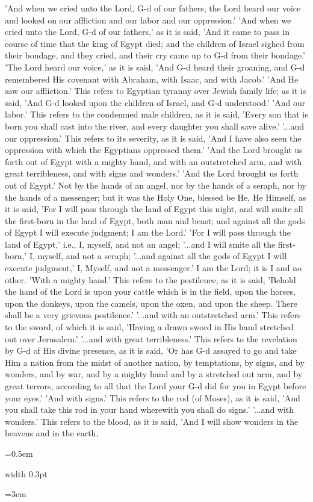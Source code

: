 \documentclass[11pt, openany]{book}
\newcommand{\sederdivider}{%
  \par\vspace{6pt}
  \begin{center}
    \textcolor{sedergold}{\pgfornament[width=1.5cm]{11}}
  \end{center}
  \par\vspace{6pt}
}
\newlength{\bidiHebWidth}
\newlength{\bidiEngWidth}
\newenvironment{bilingual}{%
  \par\vspace{4pt}%
}{%
  \noindent
  \begin{minipage}[t]{\bidiEngWidth}
    \setstretch{1.4}\emergencystretch=0.5em\normalsize
    \usebox{\bidiEngBox}
  \end{minipage}%
  \hfill
  {\color{sedergold}\vrule width 0.3pt}%
  \hfill
  \begin{minipage}[t]{\bidiHebWidth}
    \begingroup\hebrewfont\TeXXeTstate=1\beginR
    \large\setstretch{1.4}\emergencystretch=3em\tolerance=9999\parindent=0pt\relax
    \usebox{\bidiHebBox}
    \endR\endgroup
  \end{minipage}%
  \par\vspace{2pt}%
}
\newenvironment{englishcol}{%
  \begin{lrbox}{\bidiEngBox}\begin{minipage}{\bidiEngWidth}%
}{%
  \end{minipage}\end{lrbox}%
}
\begin{document}
\begin{bilingual}
\begin{englishcol}
'And when we cried unto the Lord, G-d of our fathers, the Lord heard our voice and looked on our affliction and our labor and our oppression.' 'And when we cried unto the Lord, G-d of our fathers,' as it is said, 'And it came to pass in course of time that the king of Egypt died; and the children of Israel sighed from their bondage, and they cried, and their cry came up to G-d from their bondage.'
'The Lord heard our voice,' as it is said, 'And G-d heard their groaning, and G-d remembered His covenant with Abraham, with Isaac, and with Jacob.'
'And He saw our affliction.' This refers to Egyptian tyranny over Jewish family life; as it is said, 'And G-d looked upon the children of Israel, and G-d understood.'
'And our labor.' This refers to the condemned male children, as it is said, 'Every son that is born you shall cast into the river, and every daughter you shall save alive.' '...and our oppression.' This refers to its severity, as it is said, 'And I have also seen the oppression with which the Egyptians oppressed them.'
'And the Lord brought us forth out of Egypt with a mighty hand, and with an outstretched arm, and with great terribleness, and with signs and wonders.' 'And the Lord brought us forth out of Egypt.' Not by the hands of an angel, nor by the hands of a seraph, nor by the hands of a messenger; but it was the Holy One, blessed be He, He Himself, as it is said, 'For I will pass through the land of Egypt this night, and will smite all the first-born in the land of Egypt, both man and beast; and against all the gods of Egypt I will execute judgment; I am the Lord.' 'For I will pass through the land of Egypt,' i.e., I, myself, and not an angel; '...and I will smite all the first-born,' I, myself, and not a seraph; '...and against all the gods of Egypt I will execute judgment,' I, Myself, and not a messenger.' I am the Lord; it is I and no other.
'With a mighty hand.' This refers to the pestilence, as it is said, 'Behold the hand of the Lord is upon your cattle which is in the field, upon the horses, upon the donkeys, upon the camels, upon the oxen, and upon the sheep. There shall be a very grievous pestilence.' '...and with an outstretched arm.' This refers to the sword, of which it is said, 'Having a drawn sword in His hand stretched out over Jerusalem.' '...and with great terribleness.' This refers to the revelation by G-d of His divine presence, as it is said, 'Or has G-d assayed to go and take Him a nation from the midst of another nation, by temptations, by signs, and by wonders, and by war, and by a mighty hand and by a stretched out arm, and by great terrors, according to all that the Lord your G-d did for you in Egypt before your eyes.'
'And with signs.' This refers to the rod (of Moses), as it is said, 'And you shall take this rod in your hand wherewith you shall do signs.' '...and with wonders.' This refers to the blood, as it is said, 'And I will show wonders in the heavens and in the earth,
\end{englishcol}
\end{bilingual}
\sederdivider
\end{document}
